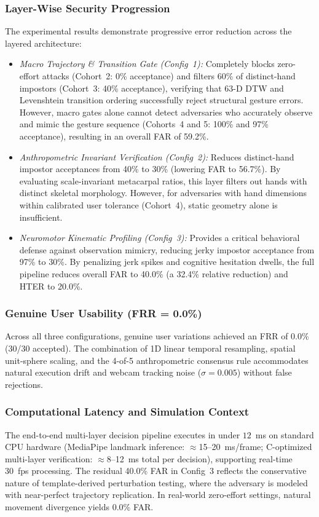 \documentclass[conference]{IEEEtran}
\begin{document}
\subsubsection{Layer-Wise Security Progression}
The experimental results demonstrate progressive error reduction across the layered architecture:
\begin{itemize}
\item \textit{Macro Trajectory \& Transition Gate (Config~1):} Completely blocks zero-effort attacks (Cohort~2: 0\% acceptance) and filters 60\% of distinct-hand impostors (Cohort~3: 40\% acceptance), verifying that 63-D DTW and Levenshtein transition ordering successfully reject structural gesture errors. However, macro gates alone cannot detect adversaries who accurately observe and mimic the gesture sequence (Cohorts~4 and 5: 100\% and 97\% acceptance), resulting in an overall FAR of 59.2\%.
\item \textit{Anthropometric Invariant Verification (Config~2):} Reduces distinct-hand impostor acceptances from 40\% to 30\% (lowering FAR to 56.7\%). By evaluating scale-invariant metacarpal ratios, this layer filters out hands with distinct skeletal morphology. However, for adversaries with hand dimensions within calibrated user tolerance (Cohort~4), static geometry alone is insufficient.
\item \textit{Neuromotor Kinematic Profiling (Config~3):} Provides a critical behavioral defense against observation mimicry, reducing jerky impostor acceptance from 97\% to 30\%. By penalizing jerk spikes and cognitive hesitation dwells, the full pipeline reduces overall FAR to 40.0\% (a 32.4\% relative reduction) and HTER to 20.0\%.
\end{itemize}

\subsubsection{Genuine User Usability (FRR = 0.0\%)}
Across all three configurations, genuine user variations achieved an FRR of 0.0\% (30/30 accepted). The combination of 1D linear temporal resampling, spatial unit-sphere scaling, and the 4-of-5 anthropometric consensus rule accommodates natural execution drift and webcam tracking noise ($\sigma = 0.005$) without false rejections.

\subsubsection{Computational Latency and Simulation Context}
The end-to-end multi-layer decision pipeline executes in under $12$~ms on standard CPU hardware (MediaPipe landmark inference: $\approx$15--20~ms/frame; C-optimized multi-layer verification: $\approx$8--12~ms total per decision), supporting real-time 30~fps processing. The residual 40.0\% FAR in Config~3 reflects the conservative nature of template-derived perturbation testing, where the adversary is modeled with near-perfect trajectory replication. In real-world zero-effort settings, natural movement divergence yields 0.0\% FAR.
\end{document}
